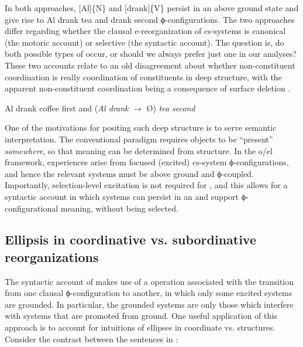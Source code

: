   In both approaches, [Al]\{N\} and [drank]\{V\} persist in an above ground state and give rise to {\textbar}Al drank tea{\textbar} and {\textbar}drank second{\textbar} ϕ-con\-fig\-u\-ra\-tions. The two approaches differ regarding whether the clausal e-reorganization of cs-systems is canonical (the motoric account) or selective (the syntactic account). The question is, do both possible types of  occur, or should we always prefer just one in our analyses? These two accounts relate to an old disagreement about whether non-constituent coordination is really coordination of constituents in deep structure, with the apparent non-constituent coordination being a consequence of surface deletion \citep{DalrympleEtAl1991,Merchant2001,SagEtAl1985}. 

  \ea\label{ex:7:2x}
{Al drank coffee first and} (\textit{Al drank} $\rightarrow$ Ø) \textit{tea second}
\z

  One of the motivations for positing such deep structure is to serve semantic interpretation. The conventional paradigm requires objects to be “present” \textit{somewhere}, so that meaning can be determined from structure. In the o/el framework,  experiences arise from  focused (excited) cs-sys\-tem ϕ-con\-fig\-u\-ra\-tions, and hence the relevant systems must be above ground and ϕ-coupled. Importantly, selection-level excitation is not required for , and this allows for a syntactic account in which systems can persist in an  and support ϕ-con\-fig\-u\-ra\-tional meaning, without being selected. 

\subsection{Ellipsis in coordinative vs. subordinative reorganizations}

The syntactic account of  makes use of a  operation associated with the transition from one clausal ϕ-con\-fig\-u\-ra\-tion to another, in which only some excited systems are grounded. In particular, the grounded systems are only those which interfere with systems that are promoted from ground. One useful application of this approach is to account for  intuitions of ellipses in coordinate vs.  structures. Consider the  contrast between the sentences in :

\ea\label{ex:7:3}
   \label{ex:7:3a}
\label{ex:7:3b}
\z
\z
\judgewidth{*}

